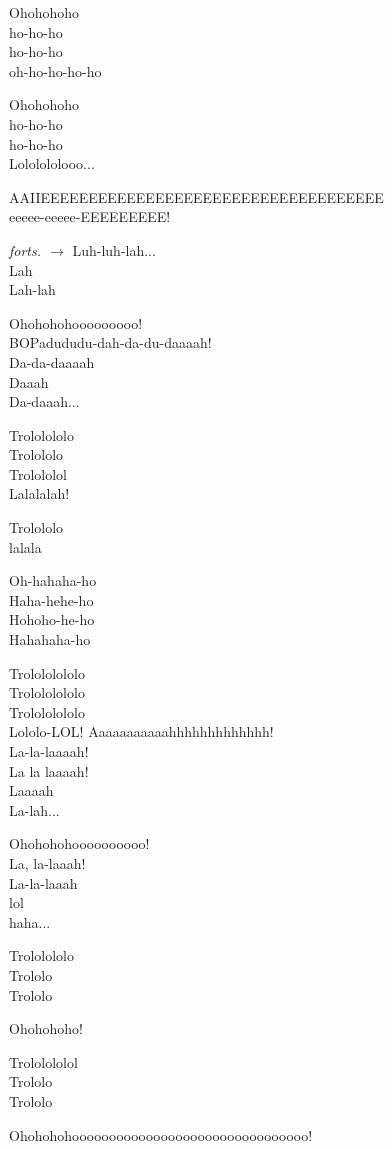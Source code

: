Ohohohoho\\
ho-ho-ho\\
ho-ho-ho\\
oh-ho-ho-ho-ho\par
\vspace{10pt}
Ohohohoho\\
ho-ho-ho\\
ho-ho-ho\\
Lololololooo...\par
\vspace{10pt}
AAIIEEEEEEEEEEEEEEEEEEEEEEEEEEEEEEEEEEEE\\
eeeee-eeeee-EEEEEEEEE!\par
\vfill
\hfill {\footnotesize\textit{forts. $\rightarrow$}}
\newpage
Luh-luh-lah...\\
Lah\\
Lah-lah\par
\vspace{10pt}
Ohohohohooooooooo!\\
BOPadududu-dah-da-du-daaaah!\\
Da-da-daaaah\\
Daaah\\
Da-daaah...\par
\vspace{10pt}
Trololololo\\
Trolololo\\
Trolololol\\
Lalalalah!\par
\vspace{10pt}
Trolololo\\
lalala\par
\vspace{10pt}
Oh-hahaha-ho\\
Haha-hehe-ho\\
Hohoho-he-ho\\
Hahahaha-ho\par
\vspace{10pt}
Trolololololo\\
Trolololololo\\
Trolololololo\\
Lololo-LOL!
\newpage
Aaaaaaaaaaahhhhhhhhhhhhh!\\
La-la-laaaah!\\
La la laaaah!\\
Laaaah\\
La-lah...\par
\vspace{10pt}
Ohohohohoooooooooo!\\
La, la-laaah!\\
La-la-laaah\\
lol\\
haha...\par
\vspace{10pt}
Trololololo\\
Trololo\\
Trololo\par
\vspace{10pt}
Ohohohoho!\par
\vspace{10pt}
Trololololol\\
Trololo\\
Trololo\par
\vspace{10pt}
Ohohohohoooooooooooooooooooooooooooooooo!
